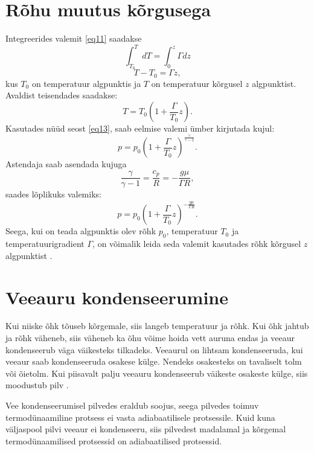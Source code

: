 \documentclass{trkut}%
\begin{document}
\section{Rõhu muutus kõrgusega }
Integreerides valemit \ref{eq11} saadakse
\begin{equation*}
\int_{T_0}^{T} dT = \int_{0}^{z} \Gamma dz
\end{equation*}
\begin{equation*}
T-T_0 = \Gamma z,
\end{equation*}
kus $T_0$ on temperatuur algpunktis ja $T$ on temperatuur kõrgusel $z$ algpunktist. Avaldist teisendades saadakse:
\begin{equation*}
T = T_0 \left(1+\frac{\Gamma}{T_0}z\right).
\end{equation*}
Kasutades nüüd seost \ref{eq13}, saab eelmise valemi ümber kirjutada kujul:
\begin{equation*}
p=p_0 \left(1+\frac{\Gamma}{T_0}z\right)^{\frac{\gamma}{\gamma-1}}.
\end{equation*}
Astendaja saab asendada kujuga
\begin{equation*}
\frac{\gamma}{\gamma-1} = \frac{c_p}{R} = -\frac{g\mu}{\Gamma R},
\end{equation*}
saades lõplikuks valemiks:
\begin{equation}\label{eq15}
p=p_0 \left(1+\frac{\Gamma}{T_0}z\right)^{ -\frac{g\mu}{\Gamma R}}.
\end{equation}
Seega, kui on teada algpunktis olev rõhk $p_0$, temperatuur $T_0$ ja temperatuurigradient $\Gamma$, on võimalik leida seda valemit kasutades rõhk kõrgusel $z$ algpunktist \parencite{Texas}.



\section{Veeauru kondenseerumine}
Kui niiske õhk tõuseb kõrgemale, siis langeb temperatuur ja rõhk. Kui õhk jahtub ja rõhk väheneb, siis väheneb ka õhu võime hoida vett auruna endas ja veeaur kondenseerub väga väikesteks tilkadeks. Veeaurul on lihtsam kondenseeruda, kui veeaur saab kondenseeruda osakese külge. Nendeks osakesteks on tavaliselt tolm või õietolm. Kui piisavalt palju veeauru kondenseerub väikeste osakeste külge, siis moodustub pilv \parencite{raamat1}.

Vee kondenseerumisel pilvedes eraldub soojus, seega pilvedes toimuv termodünaamiline protsess ei vasta adiabaatilisele protsessile. Kuid kuna väljaspool pilvi veeaur ei kondenseeru, siis pilvedest madalamal ja kõrgemal termodünaamilised protsessid on adiabaatilised protsessid.
\end{document}
